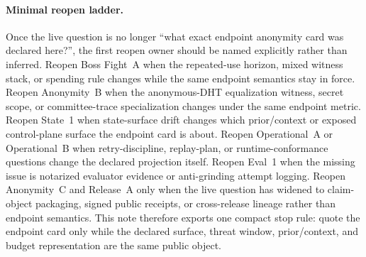 \documentclass[11pt]{article}
\theoremstyle{definition}
\theoremstyle{remark}
\begin{document}
\paragraph{Minimal reopen ladder.}
Once the live question is no longer ``what exact endpoint anonymity card was declared here?'', the first reopen owner should be named explicitly rather than inferred. Reopen Boss Fight~A when the repeated-use horizon, mixed witness stack, or spending rule changes while the same endpoint semantics stay in force. Reopen Anonymity~B when the anonymous-DHT equalization witness, secret scope, or committee-trace specialization changes under the same endpoint metric. Reopen State~1 when state-surface drift changes which prior/context or exposed control-plane surface the endpoint card is about. Reopen Operational~A or Operational~B when retry-discipline, replay-plan, or runtime-conformance questions change the declared projection itself. Reopen Eval~1 when the missing issue is notarized evaluator evidence or anti-grinding attempt logging. Reopen Anonymity~C and Release~A only when the live question has widened to claim-object packaging, signed public receipts, or cross-release lineage rather than endpoint semantics. This note therefore exports one compact stop rule: quote the endpoint card only while the declared surface, threat window, prior/context, and budget representation are the same public object.\cite{series:bossfightA,series:profiling,series:state1,series:operationalA,series:operationalB,series:eval1,series:abomoinl,series:releaseA}
\end{document}
